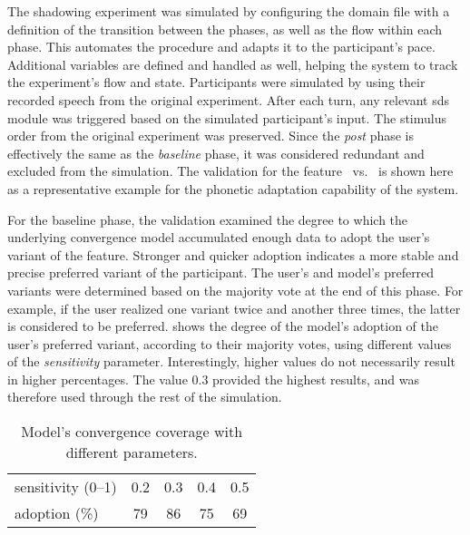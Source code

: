 \begin{figure}[t]
	\centering
	\caption[]
		{}
	\label{fig:validation}
\end{figure}

The shadowing experiment was simulated by configuring the domain file with a definition of the transition between the phases, as well as the flow within each phase.
This automates the procedure and adapts it to the participant's pace.
Additional variables are defined and handled as well, helping the system to track the experiment's flow and state.
Participants were simulated by using their recorded speech from the original experiment.
After each turn, any relevant \ac{sds} module was triggered based on the simulated participant's input.
The stimulus order from the original experiment was preserved.
Since the \emph{post} phase is effectively the same as the \emph{baseline} phase, it was considered redundant and excluded from the simulation.
The validation for the feature \textipa{[E:]}~vs.~\textipa{[e:]} is shown here as a representative example for the phonetic adaptation capability of the system.

For the baseline phase, the validation examined the degree to which the underlying convergence model accumulated enough data to adopt the user's variant of the feature.
Stronger and quicker adoption indicates a more stable and precise preferred variant of the participant.
The user's and model's preferred variants were determined based on the majority vote at the end of this phase.
For example, if the user realized one variant twice and another three times, the latter is considered to be preferred.
 shows the degree of the model's adoption of the user's preferred variant, according to their majority votes, using different values of the \emph{sensitivity} parameter.
Interestingly, higher values do not necessarily result in higher percentages.
The value 0.3 provided the highest results, and was therefore used through the rest of the simulation.

\begin{table}[t]
	\centering
	\begin{tabularx}{\linewidth}{X*{4}{S[table-format=2.1]}}
		\toprule
		sensitivity (\numrange{0}{1}) &  0.2 &  0.3 &  0.4 &  0.5 \\
		adoption (\si{\percent})      & 79   & 86   & 75   & 69   \\
		\bottomrule
	\end{tabularx}
	\caption{Model's convergence coverage with different parameters.}
	\label{tab:validation_baseline}
\end{table}


